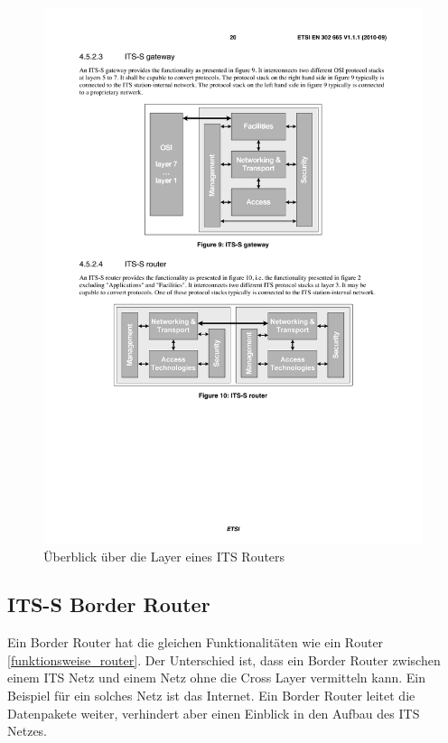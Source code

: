\begin{figure}
	\includegraphics[width=0.99\textwidth]{content/images/01_funktionsweise/layer_router.pdf}
	\caption{Überblick über die Layer eines ITS Routers \cite{en302665}}
	\label{fig:funktionsweise_layerHost}
\end{figure}



\subsection{ITS-S Border Router \label{funktionsweise_ITSBorderRouter}}
Ein Border Router hat die gleichen Funktionalitäten wie ein Router \ref{funktionsweise_router}. Der Unterschied ist, dass ein Border Router zwischen einem \ac{ITS} Netz und einem Netz ohne die Cross Layer vermitteln kann. Ein Beispiel für ein solches Netz ist das Internet. Ein Border Router leitet die Datenpakete weiter, verhindert aber einen Einblick in den Aufbau des \ac{ITS} Netzes. 

